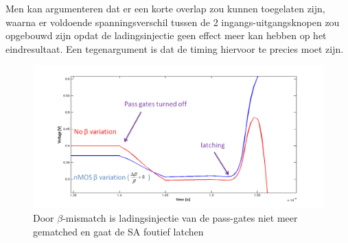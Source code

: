 Men kan argumenteren dat er een korte overlap zou kunnen toegelaten zijn, waarna er voldoende spanningsverschil tussen de 2 ingangs-uitgangsknopen zou opgebouwd zijn opdat de ladingsinjectie geen effect meer kan hebben op het eindresultaat. Een tegenargument is dat de timing hiervoor te precies moet zijn.
\begin{figure}
  \centering
  \includegraphics[scale=0.4]{../fig/hfdstk-sensamp-chargeinjectionmismatch.png}
  \caption[foutief latchen door $\beta$-mismatch]{Door $\beta$-mismatch is ladingsinjectie van de pass-gates niet meer gematched en gaat de SA foutief latchen}
  \label{fig:chargeinjectionmismatch}
\end{figure}

